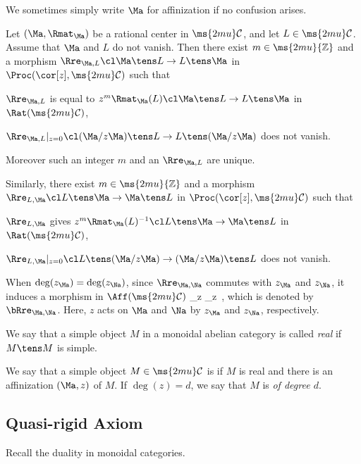 \documentclass[12pt,leqno]{amsart}%
\theoremstyle{plain}
\theoremstyle{definition}
\newcommand{\Z}{\ms{2mu}{\mathbb Z}}
\newcommand{\To}[1][{\hs{0.8ex}}]{\xrightarrow{\ms{7mu}{#1}\ms{7mu}}}
\newcommand{\z}[1][{\Ma}]{{z_{#1}}}
\newcommand{\zM}{{z_\Ma}}
\newcommand{\zN}{{z_\Na}}
\newcommand{\bna}{\be[{\rm(a)}]}
\newcommand{\shc}{{\ms{2mu}\mathcal{C}}}
\newcounter{myc}
\numberwithin{equation}{section}
\begin{document}
We sometimes simply write $\Ma$ for affinization if no confusion arises.  

\label{pro:rren}
Let $(\Ma,\Rmat_{\Ma})$ be a rational center in $\shc$, and let $L\in\shc$.
Assume that $\Ma$ and $L$ do not vanish.
Then there exist $m\in\Z$ and  a morphism
$\Rre_{\Ma,L}\cl \Ma\tens L\to L\tens \Ma$ in $\Proc(\cor[z],\shc)$ such that
\bna
\item $\Rre_{\Ma,L}$ is equal to $z^m\Rmat_{\Ma}(L)\cl \Ma\tens L\to L\tens \Ma$ in $\Rat(\shc)$,
\setcounter{myc}{\value{enumi}}
\item $\Rre_{\Ma,L}\vert_{z=0}\cl (\Ma/z\Ma)\tens L\to L\tens (\Ma/z\Ma)$
does not vanish.
\ee
\addtocounter{myc}{1}
Moreover such an integer $m$ and an $\Rre_{\Ma,L}$ are unique.

Similarly,  there exist $m\in\Z$ and  a morphism $\Rre_{L,\Ma}\cl L\tens\Ma\to \Ma\tens L$ in $\Proc(\cor[z],\shc)$ such that  
\bna
\setcounter{enumi}{\value{myc}}
\item $\Rre_{L,\Ma}$ gives $z^m\Rmat_{\Ma}(L)^{-1}\cl L\tens \Ma\to \Ma\tens L$ in $\Rat(\shc)$,
\item $\Rre_{L,\Ma}\vert_{z=0}\cl L\tens (\Ma/z\Ma)\to (\Ma/z\Ma)\tens L$
does not vanish.
\ee

\enprop

When $\deg(\z)=\deg(\zN)$, since $\Rre_{\Ma,\Na}$ commutes with $\zM$ and $\zN$, it induces a morphism in $\Aff(\shc)$
\eq \label{eq: induced_r}
 \Ma \tens_z \Na \To[\bRre_{\Ma,\Na}] \Na\tens_z \Ma\,,
\eneq
which is  denoted  by $\bRre_{\Ma,\Na}$. Here, $z$ acts on $\Ma$ and $\Na$ by $\z$ and $\z[\Na]$, respectively.

\smallskip
We say that a simple object $M$ in a monoidal abelian category is called \emph{real} if $M\tens M$ is simple. 

\Def\label{def:affreal}
We say that a simple object $M\in \shc$ is \emph{\afr} if $M$ is real and there is an affinization $(\Ma,z)$ of $M$.
If $\deg(z)=d$, we say that $M$ is \emph{\afr of degree $d$}.
\edf

%
\subsection{Quasi-rigid Axiom}\label{subsec:simplehd}

Recall the duality in monoidal categories.
\end{document}
